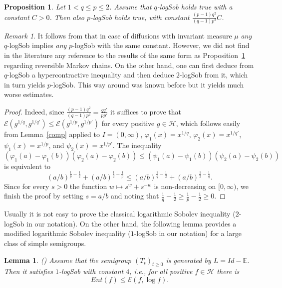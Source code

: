 \documentclass[11pt]{amsart}
\newcommand{\E}{\mathbb{E}}
\newcommand{\1}{\mathbf{1}}
\def\e{{\mathcal{E}}}
\def\E{{\mathbb E}}
\def\H{{\mathcal{H}}}
\theoremstyle{definition}
\theoremstyle{plain}
\newtheorem{lemma}[example]{Lemma}
\newtheorem{proposition}[example]{Proposition}
\theoremstyle{remark}
\newtheorem{remark}[example]{Remark}
\numberwithin{equation}{section}
\begin{document}
\begin{proposition} \label{reversinglogSob}
Let $1 < q \leq p \leq 2$. Assume that $q$-logSob holds true with a constant $C>0$. Then also $p$-logSob holds true, with constant
$\frac{(p-1)q^{2}}{(q-1)p^{2}}C$.
\end{proposition}

\begin{remark} 
It follows from  \cite[Proposition 3.1]{Bakry:94}   that  in case of  diffusions with  invariant measure $\mu$  {\em any} $q$-logSob implies {\em any} $p$-logSob with the same constant.  However, we did not find in the literature any reference to the results of the same form as Proposition~\ref{reversinglogSob} regarding reversible Markov chains. On the other hand, one can first deduce from $q$-logSob a hypercontractive inequality and then deduce $2$-logSob from it, which in turn yields $p$-logSob.
This way around was known before but it yields much worse estimates.
\end{remark}

\begin{proof}
Indeed, since $\frac{(p-1)q^{2}}{(q-1)p^{2}}=\frac{qq'}{pp'}$ it suffices to prove that
$\e(g^{1/q},g^{1/q'}) \leq \e(g^{1/p},g^{1/p'})$ for every positive
$g \in \H$, which follows easily from Lemma~\ref{comp} applied to
$I=(0,\infty)$, $\varphi_{1}(x)=x^{1/q}$, $\varphi_{2}(x)=x^{1/q'}$,
$\psi_{1}(x)=x^{1/p}$, and $\psi_{2}(x)=x^{1/p'}$. The inequality
\[
(\varphi_{1}(a)-\varphi_{1}(b))
(\varphi_{2}(a)-\varphi_{2}(b)) \leq
(\psi_{1}(a)-\psi_{1}(b))
(\psi_{2}(a)-\psi_{2}(b))
\]
is equivalent to
\[
(a/b)^{\frac{1}{p}-\frac{1}{2}}+(a/b)^{\frac{1}{2}-\frac{1}{p}}
\leq
(a/b)^{\frac{1}{q}-\frac{1}{2}}+(a/b)^{\frac{1}{2}-\frac{1}{q}}.
\]
Since for every $s>0$ the function $w \mapsto s^{w}+s^{-w}$ is non-decreasing on $[0,\infty)$, we finish the proof by setting $s=a/b$ and noting that
$\frac{1}{q}-\frac{1}{2} \geq \frac{1}{p}-\frac{1}{2} \geq 0$.
\end{proof}

Usually it is not easy to prove the classical logarithmic Sobolev inequality ($2$-logSob in our notation). On the other hand, the following lemma provides a modified logarithmic Sobolev inequality ($1$-logSob in our notation)
for a large class of simple semigroups.

\begin{lemma} (\cite{BobkovTetali06}) \label{simple}
Assume that the semigroup $(T_{t})_{t \geq 0}$ is generated by $L=Id-\E$.
Then it satisfies $1$-logSob with constant $4$, i.e., for all positive $f \in \H$ there is
\[
Ent(f) \leq \e(f, \log f).
\]
\end{lemma}
\end{document}
